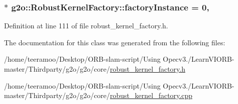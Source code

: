 \subsubsection[{\texorpdfstring{factory\+Instance}{factoryInstance}}]{ $\ast$ g2o\+::\+Robust\+Kernel\+Factory\+::factory\+Instance = 0\hspace{0.3cm}{\ttfamily [static]}, {\ttfamily [private]}}\hypertarget{classg2o_1_1RobustKernelFactory_a598761493f11f50bee72b4799fab050e}{}\label{classg2o_1_1RobustKernelFactory_a598761493f11f50bee72b4799fab050e}


Definition at line 111 of file robust\+\_\+kernel\+\_\+factory.\+h.



The documentation for this class was generated from the following files\+:\begin{DoxyCompactItemize}
\item 
/home/teeramoo/\+Desktop/\+O\+R\+B-\/slam-\/script/\+Using Opecv3./\+Learn\+V\+I\+O\+R\+B-\/master/\+Thirdparty/g2o/g2o/core/\hyperlink{robust__kernel__factory_8h}{robust\+\_\+kernel\+\_\+factory.\+h}\item 
/home/teeramoo/\+Desktop/\+O\+R\+B-\/slam-\/script/\+Using Opecv3./\+Learn\+V\+I\+O\+R\+B-\/master/\+Thirdparty/g2o/g2o/core/\hyperlink{robust__kernel__factory_8cpp}{robust\+\_\+kernel\+\_\+factory.\+cpp}\end{DoxyCompactItemize}
